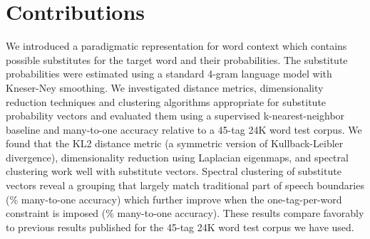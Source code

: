\section{Contributions}
\label{sec:contrib}

We introduced a paradigmatic representation for word context which
contains possible substitutes for the target word and their
probabilities.  The substitute probabilities were estimated using a
standard 4-gram language model with Kneser-Ney smoothing.  We
investigated distance metrics, dimensionality reduction techniques and
clustering algorithms appropriate for substitute probability vectors
and evaluated them using a supervised k-nearest-neighbor baseline and
many-to-one accuracy relative to a 45-tag 24K word test corpus.  We
found that the KL2 distance metric (a symmetric version of
Kullback-Leibler divergence), dimensionality reduction using Laplacian
eigenmaps, and spectral clustering work well with substitute vectors.
Spectral clustering of substitute vectors reveal a grouping that
largely match traditional part of speech boundaries (\spectralResult\%
many-to-one accuracy) which further improve when the one-tag-per-word
constraint is imposed (\collapseResult\% many-to-one accuracy).  These
results compare favorably to previous results published for the 45-tag
24K word test corpus we have used.  

